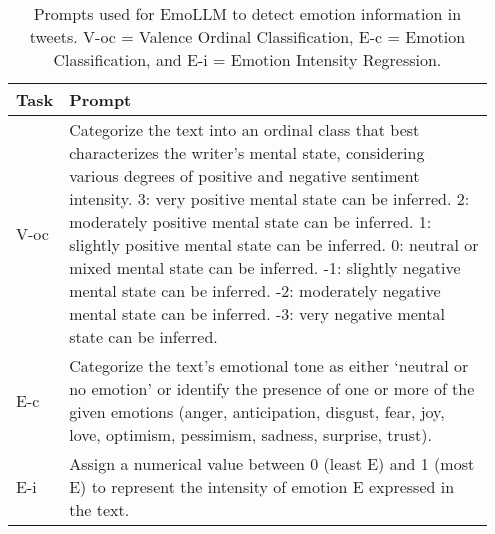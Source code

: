 \begin{table*}[!t]
    \centering
    \small
    \begin{tabular}{p{0.05\linewidth}p{0.9\linewidth}}
    \toprule
    Task & Prompt \\
    \midrule
    V-oc & Categorize the text into an ordinal class that best characterizes the writer's mental state, considering various degrees of positive and negative sentiment intensity. 3: very positive mental state can be inferred. 2: moderately positive mental state can be inferred. 1: slightly positive mental state can be inferred. 0: neutral or mixed mental state can be inferred. -1: slightly negative mental state can be inferred. -2: moderately negative mental state can be inferred. -3: very negative mental state can be inferred.\\
    \midrule
    E-c & Categorize the text's emotional tone as either `neutral or no emotion' or identify the presence of one or more of the given emotions (anger, anticipation, disgust, fear, joy, love, optimism, pessimism, sadness, surprise, trust).\\
    \midrule
    E-i & Assign a numerical value between 0 (least E) and 1 (most E) to represent the intensity of emotion E expressed in the text.\\
    \bottomrule
    \end{tabular}
    \caption{Prompts used for EmoLLM to detect emotion information in tweets. V-oc = Valence Ordinal Classification, E-c = Emotion Classification, and E-i = Emotion Intensity Regression.}
    \label{tab:emollm_ins}
\end{table*}


  
